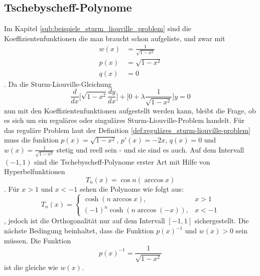%
%
%

\subsection{Tschebyscheff-Polynome\label{sub:tschebyscheff-polynome}}
Im Kapitel \ref{sub:beispiele_sturm_liouville_problem} sind die Koeffizientenfunktionen die man braucht schon aufgeliste, und zwar mit
\begin{align*}
	w(x) &= \frac{1}{\sqrt{1-x^2}} \\
	p(x) &= \sqrt{1-x^2} \\
	q(x) &= 0
\end{align*}.
Da die Sturm-Liouville-Gleichung
\begin{equation}
	\label{eq:sturm-liouville-equation-tscheby}
	\frac{d}{dx}\lbrack \sqrt{1-x^2} \frac{dy}{dx} \rbrack + \lbrack 0 + \lambda \frac{1}{\sqrt{1-x^2}} \rbrack y = 0 
\end{equation}
nun mit den Koeffizientenfunktionen aufgestellt werden kann, bleibt die Frage, ob es sich um ein reguläres oder singuläres Sturm-Liouville-Problem handelt.
Für das reguläre Problem laut der Definition \ref{def:reguläres_sturm-liouville-problem} muss die funktion $p(x) = \sqrt{1-x^2}$, $p'(x) = -2x$, $q(x) = 0$ und $w(x) = \frac{1}{\sqrt{1-x^2}}$ stetig und reell sein - und sie sind es auch.
Auf dem Intervall $(-1,1)$ sind die Tschebyscheff-Polynome erster Art mit Hilfe von Hyperbelfunktionen
\begin{equation}
	T_n(x) = \cos n (\arccos x)
\end{equation}.
Für $x>1$ und $x<-1$ sehen die Polynome wie folgt aus:
\begin{equation}
	T_n(x) = \left\{\begin{array}{ll} \cosh (n \arccos x), & x > 1\\
		(-1)^n \cosh (n \arccos (-x)), & x<-1 \end{array}\right.
\end{equation},
jedoch ist die Orthogonalität nur auf dem Intervall $[ -1, 1]$ sichergestellt.
Die nächste Bedingung beinhaltet, dass die Funktion $p(x)^{-1}$ und $w(x)>0$ sein müssen.
Die Funktion
\begin{equation*}
	p(x)^{-1} = \frac{1}{\sqrt{1-x^2}}
\end{equation*}
ist die gleiche wie $w(x)$.

